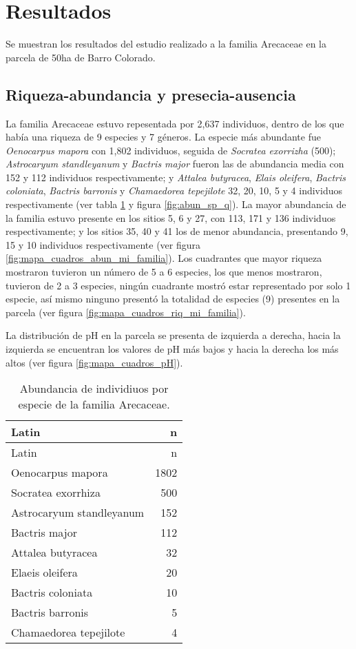 \documentclass[11pt,]{article}
\begin{document}
\section{Resultados}\label{resultados}

Se muestran los resultados del estudio realizado a la familia Arecaceae
en la parcela de 50ha de Barro Colorado.

\subsection{Riqueza-abundancia y
presecia-ausencia}\label{riqueza-abundancia-y-presecia-ausencia}

La familia Arecaceae estuvo repesentada por 2,637 individuos, dentro de
los que había una riqueza de 9 especies y 7 géneros. La especie más
abundante fue \emph{Oenocarpus mapora} con 1,802 individuos, seguida de
\emph{Socratea exorrizha} (500); \emph{Astrocaryum standleyanum} y
\emph{Bactris major} fueron las de abundancia media con 152 y 112
individuos respectivamente; y \emph{Attalea butyracea}, \emph{Elais
oleifera}, \emph{Bactris coloniata}, \emph{Bactris barronis} y
\emph{Chamaedorea tepejilote} 32, 20, 10, 5 y 4 individuos
respectivamente (ver tabla \ref{tab:abun_sp} y figura
\ref{fig:abun_sp_q}). La mayor abundancia de la familia estuvo presente
en los sitios 5, 6 y 27, con 113, 171 y 136 individuos respectivamente;
y los sitios 35, 40 y 41 los de menor abundancia, presentando 9, 15 y 10
individuos respectivamente (ver figura
\ref{fig:mapa_cuadros_abun_mi_familia}). Los cuadrantes que mayor
riqueza mostraron tuvieron un número de 5 a 6 especies, los que menos
mostraron, tuvieron de 2 a 3 especies, ningún cuadrante mostró estar
representado por solo 1 especie, así mismo ninguno presentó la totalidad
de especies (9) presentes en la parcela (ver figura
\ref{fig:mapa_cuadros_riq_mi_familia}).

La distribución de pH en la parcela se presenta de izquierda a derecha,
hacia la izquierda se encuentran los valores de pH más bajos y hacia la
derecha los más altos (ver figura \ref{fig:mapa_cuadros_pH}).

\begin{longtable}[]{@{}lr@{}}
\caption{\label{tab:abun_sp}Abundancia de individiuos por especie de la
familia Arecaceae.}\tabularnewline
\toprule
Latin & n\tabularnewline
\midrule
\endfirsthead
\toprule
Latin & n\tabularnewline
\midrule
\endhead
Oenocarpus mapora & 1802\tabularnewline
Socratea exorrhiza & 500\tabularnewline
Astrocaryum standleyanum & 152\tabularnewline
Bactris major & 112\tabularnewline
Attalea butyracea & 32\tabularnewline
Elaeis oleifera & 20\tabularnewline
Bactris coloniata & 10\tabularnewline
Bactris barronis & 5\tabularnewline
Chamaedorea tepejilote & 4\tabularnewline
\bottomrule
\end{longtable}
\end{document}

